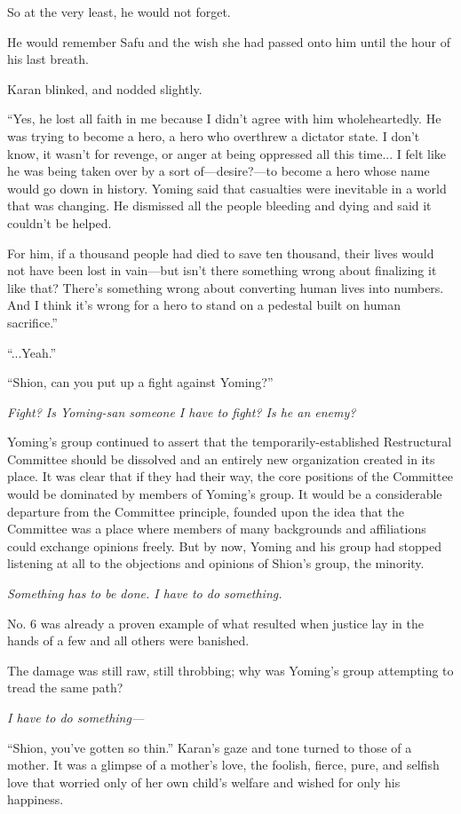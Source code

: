 So at the very least, he would not forget.

He would remember Safu and the wish she had passed onto him until the
hour of his last breath.

Karan blinked, and nodded slightly.

``Yes, he lost all faith in me because I didn't agree with him
wholeheartedly. He was trying to become a hero, a hero who overthrew a
dictator state. I don't know, it wasn't for revenge, or anger at being
oppressed all this time... I felt like he was being taken over by a sort
of---desire?---to become a hero whose name would go down in history. Yoming
said that casualties were inevitable in a world that was changing. He
dismissed all the people bleeding and dying and said it couldn't be
helped.~

For him, if a thousand people had died to save ten thousand, their lives
would not have been lost in vain---but isn't there something wrong about
finalizing it like that? There's something wrong about converting human
lives into numbers. And I think it's wrong for a hero to stand on a
pedestal built on human sacrifice.''

``...Yeah.''

``Shion, can you put up a fight against Yoming?''

\emph{Fight? Is Yoming-san someone I have to fight? Is he an enemy?}

Yoming's group continued to assert that the temporarily-established
Restructural Committee should be dissolved and an entirely new
organization created in its place. It was clear that if they had their
way, the core positions of the Committee would be dominated by members
of Yoming's group. It would be a considerable departure from the
Committee principle, founded upon the idea that the Committee was a
place where members of many backgrounds and affiliations could exchange
opinions freely. But by now, Yoming and his group had stopped listening
at all to the objections and opinions of Shion's group, the minority.

\emph{Something has to be done. I have to do something.}

No. 6 was already a proven example of what resulted when justice lay in
the hands of a few and all others were banished.~

The damage was still raw, still throbbing; why was Yoming's group
attempting to tread the same path?

\emph{I have to do something---}

``Shion, you've gotten so thin.'' Karan's gaze and tone turned to those
of a mother. It was a glimpse of a mother's love, the foolish, fierce,
pure, and selfish love that worried only of her own child's welfare and
wished for only his happiness.

